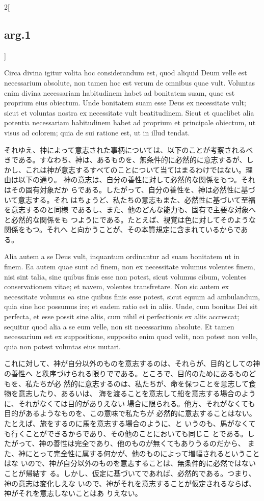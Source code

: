 \documentclass[paper=a4paper,fontsize=10pt,jafontsize=9pt,titlepage]{jlreq}
\begin{document}
\begin{paracol}{2}[\subsection{arg.1}]
\switchcolumn*


Circa divina igitur volita hoc
considerandum est, quod aliquid Deum velle est necessarium absolute, non
tamen hoc est verum de omnibus quae vult. Voluntas enim divina
necessariam habitudinem habet ad bonitatem suam, quae est proprium eius
obiectum. Unde bonitatem suam esse Deus ex necessitate vult; sicut et
voluntas nostra ex necessitate vult beatitudinem. Sicut et quaelibet
alia potentia necessariam habitudinem habet ad proprium et principale
obiectum, ut visus ad colorem; quia de sui ratione est, ut in illud
 tendat.

\switchcolumn

それゆえ、神によって意志された事柄については、以下のことが考察されるべ
 きである。すなわち、神は、あるものを、無条件的に必然的に意志するが、し
 かし、これは神が意志するすべてのことについて当てはまるわけではない。理
 由は以下の通り。
神の意志は、自分の善性に対して必然的な関係をもつ。それはその固有対象だか
 らである。したがって、自分の善性を、神は必然性に基づいて意志する。それ
 はちょうど、私たちの意志もまた、必然性に基づいて至福を意志するのと同様
 であるし、また、他のどんな能力も、固有で主要な対象へと必然的な関係をも
 つようにである。たとえば、視覚は色に対してそのような関係をもつ。それへ
 と向かうことが、その本質規定に含まれているからである。

\switchcolumn*


Alia autem a se Deus vult, inquantum ordinantur ad suam
bonitatem ut in finem. Ea autem quae sunt ad finem, non ex necessitate
volumus volentes finem, nisi sint talia, sine quibus finis esse non
potest, sicut volumus cibum, volentes conservationem vitae; et navem,
volentes transfretare. Non sic autem ex necessitate volumus ea sine
quibus finis esse potest, sicut equum ad ambulandum, quia sine hoc
possumus ire; et eadem ratio est in aliis. Unde, cum bonitas Dei sit
perfecta, et esse possit sine aliis, cum nihil ei perfectionis ex aliis
accrescat; sequitur quod alia a se eum velle, non sit necessarium
absolute. Et tamen necessarium est ex suppositione, supposito enim quod
velit, non potest non velle, quia non potest voluntas eius mutari.

\switchcolumn

これに対して、神が自分以外のものを意志するのは、それらが、目的としての神の善性へ
 と秩序づけられる限りでである。ところで、目的のためにあるものどもを、私たちが必
 然的に意志するのは、私たちが、命を保つことを意志して食物を意志したり、あるいは、
 海を渡ることを意志して船を意志する場合のように、それがなくては目的がありえない
 場合に限られる。他方、それがなくても目的があるようなものを、この意味で私たちが
 必然的に意志することはない。たとえば、旅をするのに馬を意志する場合のように、と
 いうのも、馬がなくても行くことができるからであり、その他のことにおいても同じこ
 とである。したがって、神の善性は完全であり、他のものが無くてもありうるのだから、
 また、神にとって完全性に属する何かが、他のものによって増幅されるということはな
 いので、神が自分以外のものを意志することは、無条件的に必然ではないことが帰結す
 る。しかし、仮定に基づいてであれば、必然的である。つまり、神の意志は変化しえな
 いので、神がそれを意志することが仮定されるならば、神がそれを意志しないことはあ
 りえない。


\end{paracol}
\end{document}
